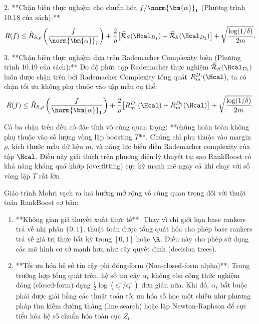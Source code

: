 2. **Chặn biên thực nghiệm cho chuẩn hóa $f/\norm{\bm{\alpha}}_1$ (Phương trình 10.18 của sách):**
\begin{equation}
    R(f) \leq \hat{R}_{S,\rho}\left(\frac{f}{\norm{\bm{\alpha}}_1}\right) + \frac{2}{\rho}\bigl[\widehat{\mathcal{R}}_S(\Hcal_{D_1}) + \widehat{\mathcal{R}}_S(\Hcal_{D_2})\bigr] + \sqrt{\frac{\log(1/\delta)}{2m}}.
    \label{eq:bound_10_18}
\end{equation}

3. **Chặn biên thực nghiệm dựa trên Rademacher Complexity biên (Phương trình 10.19 của sách):**
Do độ phức tạp Rademacher thực nghiệm $\widehat{\mathcal{R}}_S(\Hcal_{D_i})$ luôn được chặn trên bởi Rademacher Complexity tổng quát $R^{D_i}_m(\Hcal)$, ta có chặn tối ưu không phụ thuộc vào tập mẫu cụ thể:
\begin{equation}
    R(f) \leq \hat{R}_{S,\rho}\left(\frac{f}{\norm{\bm{\alpha}}_1}\right) + \frac{2}{\rho}\bigl[R^{D_1}_m(\Hcal) + R^{D_2}_m(\Hcal)\bigr] + \sqrt{\frac{\log(1/\delta)}{2m}}.
    \label{eq:bound_10_19}
\end{equation}

\begin{tcolorbox}[colback=yellow!5, colframe=orange!70!black, title={\textbf{Quan sát then chốt}}]
Cả ba chặn trên đều có đặc tính vô cùng quan trọng: **chúng hoàn toàn không phụ thuộc vào số lượng vòng lặp boosting $T$**. Chúng chỉ phụ thuộc vào margin $\rho$, kích thước mẫu dữ liệu $m$, và năng lực biểu diễn Rademacher complexity của tập $\Hcal$. Điều này giải thích trên phương diện lý thuyết tại sao RankBoost có khả năng kháng quá khớp (overfitting) cực kỳ mạnh mẽ ngay cả khi chạy với số vòng lặp $T$ rất lớn \citep{rudin2005margin}.
\end{tcolorbox}

\begin{tcolorbox}[colback=extensioncolor, colframe=yellow!60!black, title={\textbf{[MỞ RỘNG] Hai hướng tổng quát hóa thuật toán RankBoost (trang 248)}}]
Giáo trình Mohri vạch ra hai hướng mở rộng vô cùng quan trọng đối với thuật toán RankBoost cơ bản:
\begin{enumerate}
    \item **Không gian giả thuyết xuất thực tế**: Thay vì chỉ giới hạn base rankers trả về nhị phân $\{0,1\}$, thuật toán được tổng quát hóa cho phép base rankers trả về giá trị thực bất kỳ trong $[0,1]$ hoặc $\R$. Điều này cho phép sử dụng các mô hình cơ sở mạnh hơn như cây quyết định (decision trees).
    \item **Tối ưu hóa hệ số tin cậy phi đóng-form (Non-closed-form alpha)**: Trong trường hợp tổng quát trên, hệ số tin cậy $\alpha_t$ không còn công thức nghiệm đóng (closed-form) dạng $\frac{1}{2}\log(\epsilon^+_t/\epsilon^-_t)$ đơn giản nữa. Khi đó, $\alpha_t$ bắt buộc phải được giải bằng các thuật toán tối ưu hóa số học một chiều như phương pháp tìm kiếm đường thẳng (line search) hoặc lặp Newton-Raphson để cực tiểu hóa hệ số chuẩn hóa toàn cục $Z_t$.
\end{enumerate}
\end{tcolorbox}

